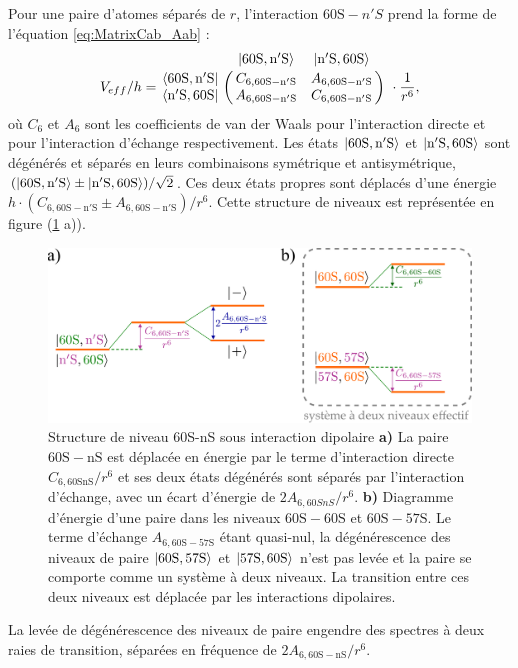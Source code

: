 Pour une paire d'atomes séparés de $r$, l'interaction $\mathrm{60S}-n'S$ prend la forme de l'équation \eqref{eq:MatrixCab_Aab} :
\begin{equation}
\label{eq:Matrix_60SnS}
V_{eff}/h = \bordermatrix{~ 	&\ket{\mathrm{60S,n'S}} 	& \ket{\mathrm{n'S,60S}} \cr
	\bra{\mathrm{60S,n'S}}		&C_{6,\mathrm{60S-n'S}}		&A_{6,\mathrm{60S-n'S}}	\cr 
	\bra{\mathrm{n'S,60S}} 		&A_{6,\mathrm{60S-n'S}}		&C_{6,\mathrm{60S-n'S}} \cr} \ \cdot \frac{1}{r^6},
\end{equation}
%
où $C_6$ et $A_6$ sont les coefficients de van der Waals pour l'interaction directe et pour l'interaction d'échange respectivement.
Les états $\ket{\mathrm{60S,n'S}}$ et $\ket{\mathrm{n'S,60S}}$ sont dégénérés et séparés en leurs combinaisons symétrique et antisymétrique, $(\ket{\mathrm{60S,n'S}}\pm\ket{\mathrm{n'S,60S}})/\sqrt{2}$.
Ces deux états propres sont déplacés d'une énergie $h\cdot (C_{6,\mathrm{60S-n'S}} \pm A_{6,\mathrm{60S-n'S}}) / r^6$.
Cette structure de niveaux est représentée en figure (\ref{fig:60S-nS} a)).
%
\begin{figure}[h]
\centering
\includegraphics[width=\linewidth]{figures/low_l/60S-nS}
\caption[Structure de niveau 60S-nS sous interaction dipolaire]{
Structure de niveau 60S-nS sous interaction dipolaire
\textbf{a)} La paire $\mathrm{60S-nS}$ est déplacée en énergie par le terme d'interaction directe $C_{6,\mathrm{60SnS}}/r^6$ et ses deux états dégénérés sont séparés par l'interaction d'échange, avec un écart d'énergie de $2A_{6,60SnS}/r^6$.
\textbf{b)} Diagramme d'énergie d'une paire dans les niveaux $\mathrm{60S-60S}$ et $\mathrm{60S-57S}$.
Le terme d'échange $A_{6,\mathrm{60S-57S}}$ étant quasi-nul, la dégénérescence des niveaux de paire $\ket{\mathrm{60S,57S}}$ et $\ket{\mathrm{57S,60S}}$ n'est pas levée et la paire se comporte comme un système à deux niveaux.
La transition entre ces deux niveaux est déplacée par les interactions dipolaires.
}
\label{fig:60S-nS}
\end{figure}
%
La levée de dégénérescence des niveaux de paire engendre des spectres à deux raies de transition, séparées en fréquence de $2A_{6,\mathrm{60S-nS}}/r^6$.
